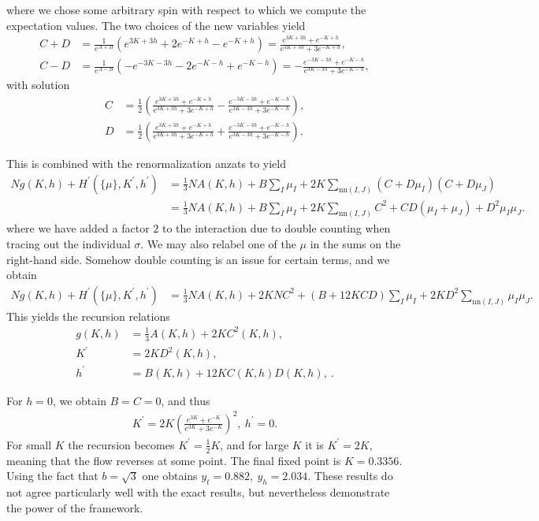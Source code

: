 where we chose some arbitrary spin with respect to which we compute the expectation values. The two choices of the new variables yield
\begin{align*}
	C + D &= \frac{1}{e^{A + B}}(e^{3K + 3h} + 2e^{-K + h} - e^{-K + h}) = \frac{e^{3K + 3h} + e^{-K + h}}{e^{3K + 3h} + 3e^{-K + h}}, \\
	C - D &= \frac{1}{e^{A - B}}(-e^{-3K - 3h} - 2e^{-K - h} + e^{-K - h}) = -\frac{e^{-3K - 3h} + e^{-K - h} }{e^{3K - 3h} + 3e^{-K - h}},
\end{align*}
with solution
\begin{align*}
	C &= \frac{1}{2}\left(\frac{e^{3K + 3h} + e^{-K + h}}{e^{3K + 3h} + 3e^{-K + h}} - \frac{e^{-3K - 3h} + e^{-K - h} }{e^{3K - 3h} + 3e^{-K - h}}\right), \\
	D &= \frac{1}{2}\left(\frac{e^{3K + 3h} + e^{-K + h}}{e^{3K + 3h} + 3e^{-K + h}} + \frac{e^{-3K - 3h} + e^{-K - h} }{e^{3K - 3h} + 3e^{-K - h}}\right).
\end{align*}

This is combined with the renormalization anzats to yield
\begin{align*}
	Ng(K, h) + H^{\prime}(\{\mu\}, K^{\prime}, h^{\prime}) &= \frac{1}{3}NA(K, h) + B\sum\limits_{I}\mu_{I} + 2K\sum\limits_{\text{nn}(I, J)}(C + D\mu_{I})(C + D\mu_{J}) \\
	                                                       &= \frac{1}{3}NA(K, h) + B\sum\limits_{I}\mu_{I} + 2K\sum\limits_{\text{nn}(I, J)}C^{2} + CD(\mu_{I} + \mu_{J}) + D^{2}\mu_{I}\mu_{J}.
\end{align*}
where we have added a factor $2$ to the interaction due to double counting when tracing out the individual $\sigma$. We may also relabel one of the $\mu$ in the sums on the right-hand side. Somehow double counting is an issue for certain terms, and we obtain
\begin{align*}
	Ng(K, h) + H^{\prime}(\{\mu\}, K^{\prime}, h^{\prime}) &= \frac{1}{3}NA(K, h) + 2KNC^{2} + (B + 12KCD)\sum\limits_{I}\mu_{I} + 2KD^{2}\sum\limits_{\text{nn}(I, J)}\mu_{I}\mu_{J}.
\end{align*}
This yields the recursion relations
\begin{align*}
	g(K, h)    &= \frac{1}{3}A(K, h) + 2KC^{2}(K, h), \\
	K^{\prime} &= 2KD^{2}(K, h), \\
	h^{\prime} &= B(K, h) + 12KC(K, h)D(K, h),\ .
\end{align*}

For $h = 0$, we obtain $B = C = 0$, and thus
\begin{align*}
	K^{\prime} = 2K\left(\frac{e^{3K} + e^{-K}}{e^{3K} + 3e^{-K}}\right)^{2},\ h^{\prime} = 0.
\end{align*}
For small $K$ the recursion becomes $K^{\prime} = \frac{1}{2}K$, and for large $K$ it is $K^{\prime} = 2K$, meaning that the flow reverses at some point. The final fixed point is $K = 0.3356$. Using the fact that $b = \sqrt{3}$ one obtains  $y_{t} = 0.882,\ y_{h} = 2.034$. These results do not agree particularly well with the exact results, but nevertheless demonstrate the power of the framework.

